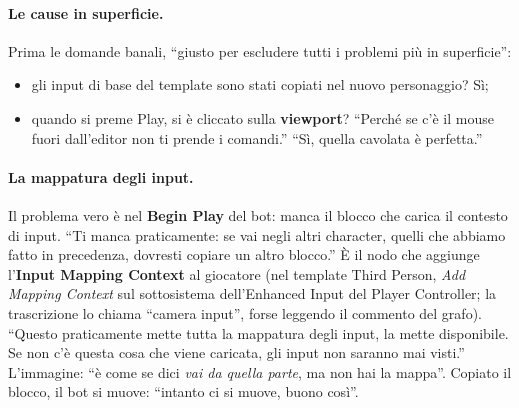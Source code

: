 \paragraph{Le cause in superficie.} Prima le domande banali, ``giusto per escludere tutti
i problemi più in superficie'':
\begin{itemize}
  \item gli input di base del template sono stati copiati nel nuovo personaggio? Sì;
  \item quando si preme Play, si è cliccato sulla \textbf{viewport}? ``Perché se c'è il
        mouse fuori dall'editor non ti prende i comandi.'' ``Sì, quella cavolata è
        perfetta.''
\end{itemize}

\paragraph{La mappatura degli input.} Il problema vero è nel \textbf{Begin Play} del bot:
manca il blocco che carica il contesto di input. ``Ti manca praticamente: se vai negli
altri character, quelli che abbiamo fatto in precedenza, dovresti copiare un altro
blocco.'' È il nodo che aggiunge l'\textbf{Input Mapping Context} al giocatore (nel
template Third Person, \emph{Add Mapping Context} sul sottosistema dell'Enhanced Input
del Player Controller; la trascrizione lo chiama ``camera input'', forse leggendo il
commento del grafo). ``Questo praticamente mette tutta la mappatura degli input, la mette
disponibile. Se non c'è questa cosa che viene caricata, gli input non saranno mai
visti.'' L'immagine: ``è come se dici \emph{vai da quella parte}, ma non hai la
mappa''. Copiato il blocco, il bot si muove: ``intanto ci si muove, buono così''.


